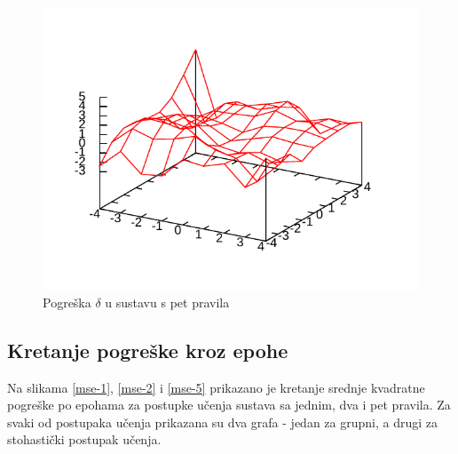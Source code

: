 \documentclass{article}
\begin{document}
\begin{figure}[h]
    \centering
    \includegraphics{img/errors-batch-5.pdf}
    \caption{Pogreška $ \delta $ u sustavu s pet pravila}
    \label{err-5}
\end{figure}

\subsection{Kretanje pogreške kroz epohe}

Na slikama \ref{mse-1}, \ref{mse-2} i \ref{mse-5}
prikazano je kretanje srednje kvadratne pogreške po epohama
za postupke učenja sustava sa jednim, dva i pet pravila.
Za svaki od postupaka učenja prikazana su dva grafa -
jedan za grupni, a drugi za stohastički postupak učenja.
\end{document}
